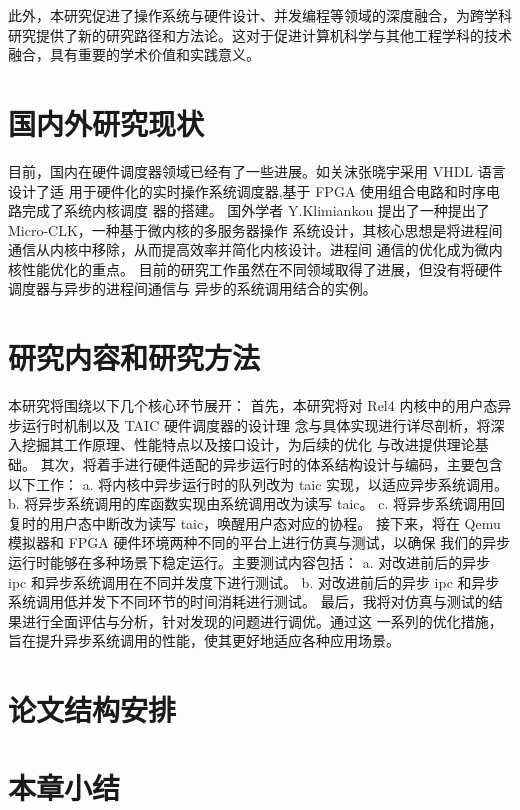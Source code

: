 此外，本研究促进了操作系统与硬件设计、并发编程等领域的深度融合，为跨学科研究提供了新的研究路径和方法论。这对于促进计算机科学与其他工程学科的技术融合，具有重要的学术价值和实践意义。

\section{国内外研究现状}

目前，国内在硬件调度器领域已经有了一些进展。如关沫张晓宇采用 VHDL 语言设计了适
用于硬件化的实时操作系统调度器,基于 FPGA 使用组合电路和时序电路完成了系统内核调度
器的搭建。
国外学者 Y.Klimiankou 提出了一种提出了 Micro-CLK，一种基于微内核的多服务器操作
系统设计，其核心思想是将进程间通信从内核中移除，从而提高效率并简化内核设计。进程间
通信的优化成为微内核性能优化的重点。
目前的研究工作虽然在不同领域取得了进展，但没有将硬件调度器与异步的进程间通信与
异步的系统调用结合的实例。

\section{研究内容和研究方法}

本研究将围绕以下几个核心环节展开：
首先，本研究将对 Rel4 内核中的用户态异步运行时机制以及 TAIC 硬件调度器的设计理
念与具体实现进行详尽剖析，将深入挖掘其工作原理、性能特点以及接口设计，为后续的优化
与改进提供理论基础。
其次，将着手进行硬件适配的异步运行时的体系结构设计与编码，主要包含以下工作：
a. 将内核中异步运行时的队列改为 taic 实现，以适应异步系统调用。
b. 将异步系统调用的库函数实现由系统调用改为读写 taic。
c. 将异步系统调用回复时的用户态中断改为读写 taic，唤醒用户态对应的协程。
接下来，将在 Qemu 模拟器和 FPGA 硬件环境两种不同的平台上进行仿真与测试，以确保
我们的异步运行时能够在多种场景下稳定运行。主要测试内容包括：
a. 对改进前后的异步 ipc 和异步系统调用在不同并发度下进行测试。
b. 对改进前后的异步 ipc 和异步系统调用低并发下不同环节的时间消耗进行测试。
最后，我将对仿真与测试的结果进行全面评估与分析，针对发现的问题进行调优。通过这
一系列的优化措施，旨在提升异步系统调用的性能，使其更好地适应各种应用场景。

\section{论文结构安排}

\section{本章小结}

